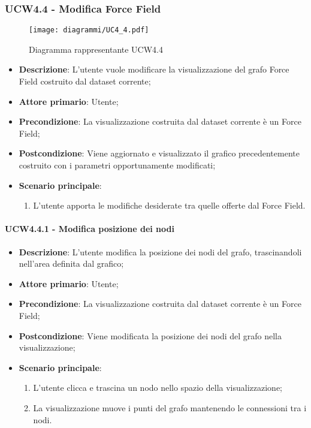 \newpage
\subsubsection{UCW4.4 - Modifica Force Field}
\label{ssub:ucw4.4}
\begin{figure}[h]
    \centering
    \texttt{[image: diagrammi/UC4\_4.pdf]}
    \caption{Diagramma rappresentante UCW4.4}
    \label{fig:UCW4.4}
\end{figure}


\begin{itemize}
    \item \textbf{Descrizione}: L’utente vuole modificare la visualizzazione del grafo Force Field
                                costruito dal dataset corrente;

    \item \textbf{Attore primario}: Utente;

    \item \textbf{Precondizione}:   La visualizzazione costruita dal dataset corrente è un Force Field;

    \item \textbf{Postcondizione}:  Viene aggiornato e visualizzato il grafico precedentemente costruito con i parametri opportunamente modificati;

    \item \textbf{Scenario principale}: 
    \begin{enumerate}
        \item L'utente apporta le modifiche desiderate tra quelle offerte dal Force Field.
    \end{enumerate}
\end{itemize}

\paragraph{UCW4.4.1 - Modifica posizione dei nodi}
\label{par:ucW4.4.1}
\begin{itemize}
    \item \textbf{Descrizione}: L’utente modifica la posizione dei nodi del grafo, trascinandoli nell'area definita dal grafico;

    \item \textbf{Attore primario}: Utente;

    \item \textbf{Precondizione}:   La visualizzazione costruita dal dataset corrente è un Force Field;
    \item \textbf{Postcondizione}:  Viene modificata la posizione dei nodi del grafo nella visualizzazione;

	\item \textbf{Scenario principale}:
        \begin{enumerate}
            \item L'utente clicca e trascina un nodo nello spazio della visualizzazione;
            \item La visualizzazione muove i punti del grafo mantenendo le connessioni tra i nodi.
        \end{enumerate}
\end{itemize}

